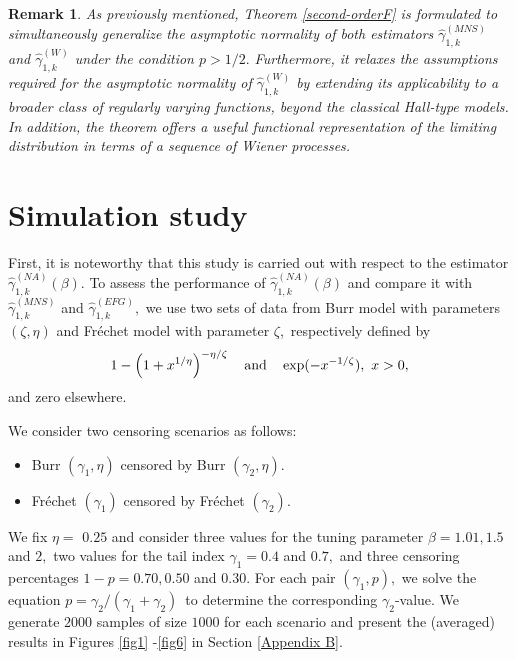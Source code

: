 \documentclass[reqno,openbib,runningheads,a4paper,12pt]{amsart}%
\newtheorem{remark}{Remark}[section]
\begin{document}
\begin{remark}
As previously mentioned, Theorem \ref{second-orderF} is formulated to
simultaneously generalize the asymptotic normality of both estimators
$\widehat{\gamma}_{1,k}^{\left(  MNS\right)  }$ and $\widehat{\gamma}%
_{1,k}^{\left(  W\right)  }$ under the condition $p>1/2.$ Furthermore, it
relaxes the assumptions required for the asymptotic normality of
$\widehat{\gamma}_{1,k}^{\left(  W\right)  }$\citep[] []{BWW2019} by extending
its applicability to a broader class of regularly varying functions, beyond
the classical Hall-type models. In addition, the theorem offers a useful
functional representation of the limiting distribution in terms of a sequence
of Wiener processes.
\end{remark}

\section{\textbf{Simulation study\label{sec3}}}

\noindent First, it is noteworthy that this study is carried out with respect
to the estimator $\widehat{\gamma}_{1,k}^{\left(  NA\right)  }\left(
\beta\right)  .$ To assess the performance of $\widehat{\gamma}_{1,k}^{\left(
NA\right)  }\left(  \beta\right)  $ and compare it with $\widehat{\gamma
}_{1,k}^{\left(  MNS\right)  }$ and $\widehat{\gamma}_{1,k}^{\left(
EFG\right)  },$ we use two sets of data from Burr model with parameters
$(\zeta,\eta)$ and Fr\'{e}chet model with parameter $\zeta$,\ respectively
defined by
\[
1-\left(  1+x^{1/\eta}\right)  ^{-\eta/\zeta}\text{\quad and\quad}%
\exp(-x^{-1/\zeta}),\text{ }x>0,
\]
and zero elsewhere.\medskip

\noindent We consider two censoring scenarios as follows:

\begin{itemize}
\item[$\bullet$] Burr $(\gamma_{1},\eta)$ censored by Burr $(\gamma_{2}%
,\eta).$

\item[$\bullet$] Fr\'{e}chet $(\gamma_{1})$ censored by Fr\'{e}chet
$(\gamma_{2}).$
\end{itemize}

\noindent We fix $\eta=$ $0.25$ and consider three values for the tuning
parameter $\beta=1.01,1.5$ and $2,$ two values for the tail index $\gamma
_{1}=0.4$ and $0.7,$ and three censoring percentages $1-p=0.70,0.50$ and
$0.30.$ For each pair $\left(  \gamma_{1},p\right)  ,$ we solve the equation
$p=\gamma_{2}/\left(  \gamma_{1}+\gamma_{2}\right)  $\ to determine the
corresponding $\gamma_{2}$-value. We generate $2000$ samples of size $1000$
for each scenario and present the (averaged) results in Figures \ref{fig1}%
-\ref{fig6} in Section \ref{Appendix B}.\medskip
\end{document}
